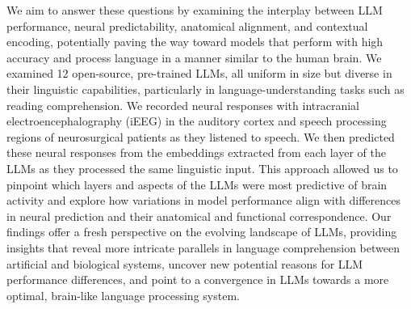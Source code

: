 We aim to answer these questions by examining the interplay between LLM performance, neural predictability, anatomical alignment, and contextual encoding, potentially paving the way toward models that perform with high accuracy and process language in a manner similar to the human brain. We examined 12 open-source, pre-trained LLMs, all uniform in size but diverse in their linguistic capabilities, particularly in language-understanding tasks such as reading comprehension. We recorded neural responses with intracranial electroencephalography (iEEG) in the auditory cortex and speech processing regions of neurosurgical patients as they listened to speech. We then predicted these neural responses from the embeddings extracted from each layer of the LLMs as they processed the same linguistic input. This approach allowed us to pinpoint which layers and aspects of the LLMs were most predictive of brain activity and explore how variations in model performance align with differences in neural prediction and their anatomical and functional correspondence. Our findings offer a fresh perspective on the evolving landscape of LLMs, providing insights that reveal more intricate parallels in language comprehension between artificial and biological systems, uncover new potential reasons for LLM performance differences, and point to a convergence in LLMs towards a more optimal, brain-like language processing system.



